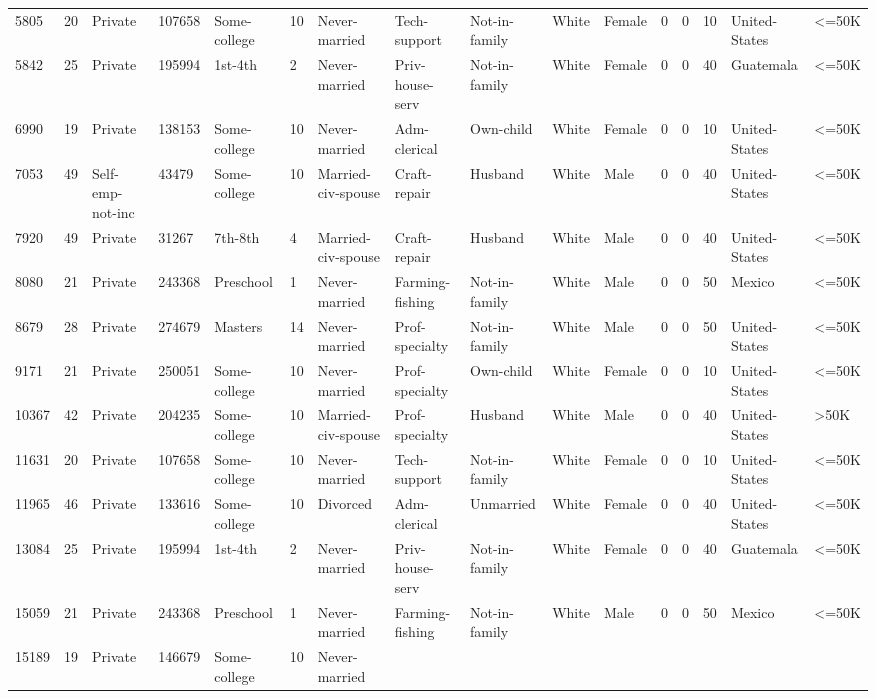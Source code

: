 \documentclass[
  letterpaper,
  DIV=11,
  numbers=noendperiod]{scrartcl}
\begin{document}
\begin{longtable}[]{@{}llllllllllllllll@{}}
5805 & 20 & Private & 107658 & Some-college & 10 & Never-married &
Tech-support & Not-in-family & White & Female & 0 & 0 & 10 &
United-States & \textless=50K \\
5842 & 25 & Private & 195994 & 1st-4th & 2 & Never-married &
Priv-house-serv & Not-in-family & White & Female & 0 & 0 & 40 &
Guatemala & \textless=50K \\
6990 & 19 & Private & 138153 & Some-college & 10 & Never-married &
Adm-clerical & Own-child & White & Female & 0 & 0 & 10 & United-States &
\textless=50K \\
7053 & 49 & Self-emp-not-inc & 43479 & Some-college & 10 &
Married-civ-spouse & Craft-repair & Husband & White & Male & 0 & 0 & 40
& United-States & \textless=50K \\
7920 & 49 & Private & 31267 & 7th-8th & 4 & Married-civ-spouse &
Craft-repair & Husband & White & Male & 0 & 0 & 40 & United-States &
\textless=50K \\
8080 & 21 & Private & 243368 & Preschool & 1 & Never-married &
Farming-fishing & Not-in-family & White & Male & 0 & 0 & 50 & Mexico &
\textless=50K \\
8679 & 28 & Private & 274679 & Masters & 14 & Never-married &
Prof-specialty & Not-in-family & White & Male & 0 & 0 & 50 &
United-States & \textless=50K \\
9171 & 21 & Private & 250051 & Some-college & 10 & Never-married &
Prof-specialty & Own-child & White & Female & 0 & 0 & 10 & United-States
& \textless=50K \\
10367 & 42 & Private & 204235 & Some-college & 10 & Married-civ-spouse &
Prof-specialty & Husband & White & Male & 0 & 0 & 40 & United-States &
\textgreater50K \\
11631 & 20 & Private & 107658 & Some-college & 10 & Never-married &
Tech-support & Not-in-family & White & Female & 0 & 0 & 10 &
United-States & \textless=50K \\
11965 & 46 & Private & 133616 & Some-college & 10 & Divorced &
Adm-clerical & Unmarried & White & Female & 0 & 0 & 40 & United-States &
\textless=50K \\
13084 & 25 & Private & 195994 & 1st-4th & 2 & Never-married &
Priv-house-serv & Not-in-family & White & Female & 0 & 0 & 40 &
Guatemala & \textless=50K \\
15059 & 21 & Private & 243368 & Preschool & 1 & Never-married &
Farming-fishing & Not-in-family & White & Male & 0 & 0 & 50 & Mexico &
\textless=50K \\
15189 & 19 & Private & 146679 & Some-college & 10 & Never-married &

\end{longtable}
\end{document}
